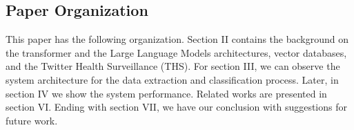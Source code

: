 \subsection{Paper Organization}
This paper has the following organization. Section II contains the background on the transformer and the Large Language Models architectures, vector databases, and the Twitter Health Surveillance (THS). For section III, we can observe the system architecture for the data extraction and classification process. Later, in section IV we show the system performance. Related works are presented in section VI. Ending with section VII, we have our conclusion with suggestions for future work.
